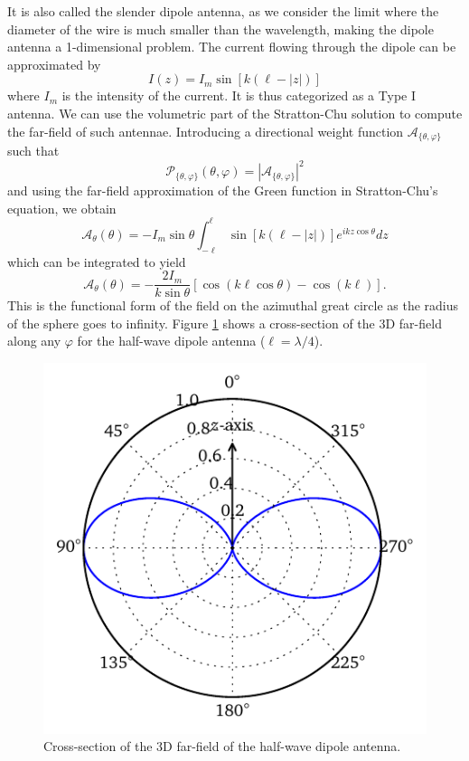 \begin{exmp}
		\noindent It is also called the
		slender dipole antenna, as we consider the limit where the diameter of
		the wire is much smaller than the wavelength, making the dipole antenna
		a 1-dimensional problem. The current flowing through the dipole can be
		approximated by 
			\begin{equation}
				I(z) = I_m\sin\left[k(\ell-|z|)\right]
			\end{equation}
		where $I_m$ is the intensity of the current.
		It is thus categorized as a Type I antenna. We can use the volumetric part
		of the Stratton-Chu solution to compute the far-field of such antennae. Introducing
		a directional weight function $\mathcal{A}_{\{\theta,\varphi\}}$ such that
			\begin{equation}
				\mathcal{P}_{\{\theta,\varphi\}}(\theta,\varphi) = \left|\mathcal{A}_{\{\theta,\varphi\}}\right|^2
			\end{equation}
		and using the far-field approximation of the Green function in Stratton-Chu's equation, we obtain
			\begin{equation}
				\mathcal{A}_\theta(\theta) = -I_m\sin\theta\int_{-\ell}^\ell\sin\left[k(\ell-|z|)\right]e^{ikz\cos\theta}dz
			\end{equation}
		which can be integrated to yield
			\begin{equation}
				\mathcal{A}_\theta(\theta) = -\frac{2I_m}{k\sin\theta}\left[\cos(k\ell\cos\theta)-\cos(k\ell)\right].
			\end{equation}
		This is the functional form of the field on the azimuthal great circle as the radius of the sphere goes
		to infinity.  Figure \ref{fig:active.antennae.dipoleFarField} shows a cross-section of the 3D far-field
		along any $\varphi$ for the half-wave dipole antenna ($\ell=\lambda/4$).
		
		\begin{figure}
			\centering
			\includegraphics{figs/active/farField-dipole.pdf}
			\caption{Cross-section of the 3D far-field of the half-wave dipole antenna.}
			\label{fig:active.antennae.dipoleFarField}
		\end{figure}
	\end{exmp}
	
